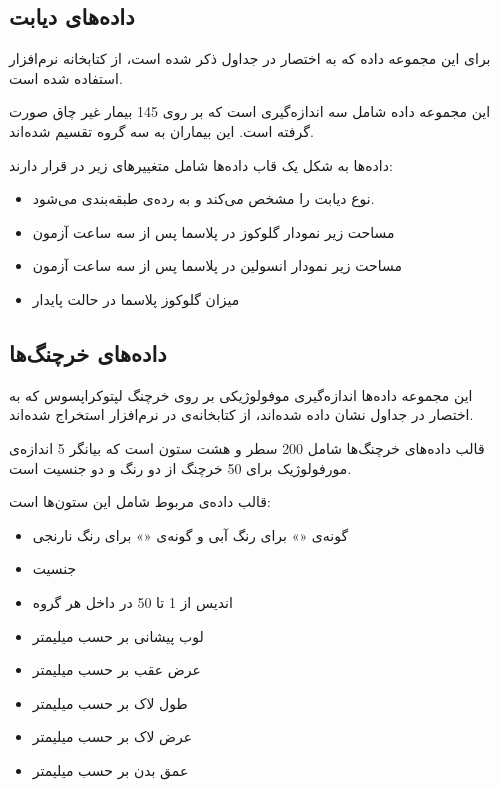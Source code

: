 \subsection{
داده‌های دیابت
}
\label{sec:Diabetes}

برای این مجموعه داده که به اختصار 
در جداول ذکر شده است، از کتابخانه
\cite{rmclust}
نرم‌افزار 
استفاده شده است.

این مجموعه داده شامل سه اندازه‌گیری است که بر روی 145 بیمار غیر چاق صورت گرفته است. این بیماران به سه گروه تقسیم شده‌اند.

داده‌ها به شکل یک قاب داده‌ها شامل متغییرهای زیر در 
قرار دارند:

\begin{itemize}
\item
{}
نوع دیابت را مشخص می‌کند و به رده‌ی 
طبقه‌بندی می‌شود.
\item
{}
مساحت زیر نمودار گلوکوز در پلاسما پس از سه ساعت آزمون 
\item
{}
مساحت زیر نمودار انسولین در پلاسما پس از سه ساعت آزمون
\item
{}
میزان گلوکوز پلاسما در حالت پایدار
\end{itemize}

\subsection{
داده‌های خرچنگ‌ها
}
\label{sec:Crabs}

این مجموعه داده‌ها اندازه‌گیری موفولوژیکی
بر روی خرچنگ لپتوکراپسوس  که به اختصار
در جداول نشان داده شده‌اند، از کتابخانه‌ی 
\cite{rMASS}
در نرم‌افزار 
استخراج شده‌اند.

قالب داده‌های خرچنگ‌ها شامل 200 سطر و هشت ستون است که بیانگر 5 اندازه‌ی مورفولوژیک برای 50 خرچنگ از دو رنگ و دو جنسیت است.

قالب داده‌ی مربوط شامل این ستون‌ها است:

\begin{itemize}
\item
{}
گونه‌ی «» برای رنگ آبی و گونه‌ی «» برای رنگ نارنجی
\item
{}
جنسیت
\item
{}
اندیس از 1 تا 50 در داخل هر گروه
\item
{}
لوب پیشانی بر حسب میلیمتر
\item
{}
عرض عقب بر حسب میلیمتر
\item
{}
طول لاک بر حسب میلیمتر
\item
{}
عرض لاک بر حسب میلیمتر
\item
{}
عمق بدن بر حسب میلیمتر
\end{itemize}

